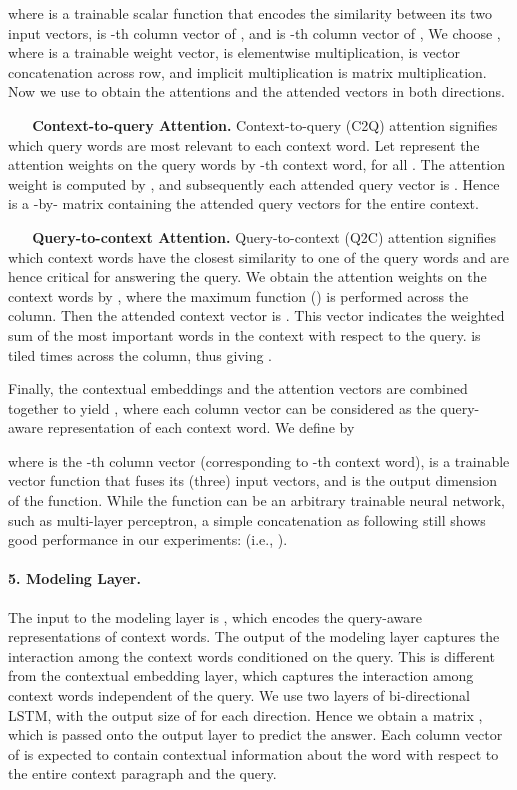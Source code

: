 \documentclass{article} \usepackage{iclr2017_conference,times}
\begin{document}
where  is a trainable scalar function that encodes the similarity between its two input vectors,
 is -th column vector of , and
 is -th column vector of ,
We choose ,
where  is a trainable weight vector, 
 is elementwise multiplication,
 is vector concatenation across row,
and implicit multiplication is matrix multiplication.
Now we use  to obtain the attentions and the attended vectors in both directions.

\textbf{\ \ \ Context-to-query Attention.} 
Context-to-query (C2Q) attention signifies which query words are most relevant to each context word.
Let  represent the attention weights on the query words by -th context word,  for all . The attention weight is computed by ,
and subsequently each attended query vector is .
Hence  is a -by- matrix containing the attended query vectors for the entire context.

\textbf{\ \ \ Query-to-context Attention.}
Query-to-context (Q2C) attention signifies which context words have the closest similarity to one of the query words and are hence critical for answering the query. We obtain the attention weights on the context words by , where the maximum function () is performed across the column. Then the attended context vector is . This vector  indicates the weighted sum of the most important words in the context with respect to the query.
 is tiled  times across the column, thus giving .

Finally, the contextual embeddings and the attention vectors are combined together to yield , where each column vector can be considered as the query-aware representation of each context word.
We define  by

where  is the -th column vector (corresponding to -th context word),
 is a trainable vector function that fuses its (three) input vectors,
and  is the output dimension of the  function.
While the  function can be an arbitrary trainable neural network, such as multi-layer perceptron, 
a simple concatenation as following still shows good performance in our experiments:  (i.e., ).

\paragraph{5. Modeling Layer.}\label{subsec:main}
The input to the modeling layer is  , which encodes the query-aware representations of context words.
The output of the modeling layer captures the interaction among the context words conditioned on the query.
This is different from the contextual embedding layer, which captures the interaction among context words independent of the query. 
We use two layers of bi-directional LSTM, with the output size of  for each direction. 
Hence we obtain a matrix , which is passed onto the output layer to predict the answer. 
Each column vector of  is expected to contain contextual information about the word with respect to the entire context paragraph and the query.
\end{document}
